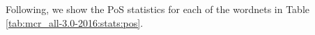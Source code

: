 \documentclass[runningheads]{llncs}
\begin{document}
Following, we show the PoS  statistics for each of the wordnets in Table \ref{tab:mcr_all-3.0-2016:stats:pos}. 






      
        
\end{document}
